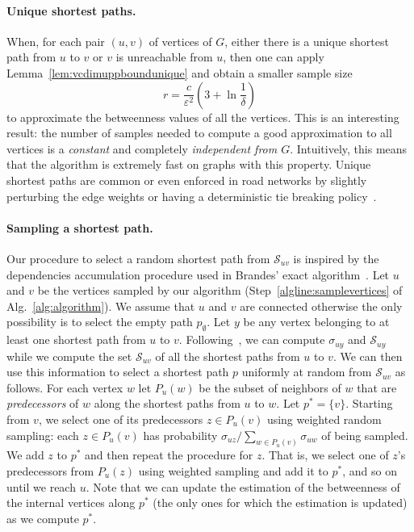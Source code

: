 \paragraph{Unique shortest paths.} 
When, for each pair $(u,v)$ of vertices of $G$, either there is a unique
shortest path from $u$ to $v$ or $v$ is unreachable from $u$, 
 then one can apply Lemma~\ref{lem:vcdimuppboundunique} and obtain a smaller
sample size
\[
  r= \frac{c}{\varepsilon^2}\left(3+\ln\frac{1}{\delta}\right)
\]
to approximate the betweenness values of all the vertices. 
This is an interesting result: the number of samples needed to compute a good
approximation to all vertices is a \emph{constant} and completely
\emph{independent from $G$}. Intuitively, this means that the algorithm is
extremely fast on graphs with this property. Unique shortest paths are common or
even enforced in road networks by slightly perturbing the edge weights or having
a deterministic tie breaking policy~\citep{GeisbergerSS08}.

\paragraph{Sampling a shortest path.}
Our procedure to select a random shortest path from $\mathcal{S}_{uv}$ is
inspired by the dependencies accumulation procedure used in Brandes' exact
algorithm~\citep{Brandes01}. Let $u$ and $v$ be the vertices sampled by our algorithm
(Step~\ref{algline:samplevertices} of Alg.~\ref{alg:algorithm}). We assume that $u$ and
$v$ are connected otherwise the only possibility is to select the empty path
$p_\emptyset$. Let $y$ be any vertex belonging to at least one shortest path
from $u$ to $v$. Following~\citet{Brandes01}, we can compute $\sigma_{uy}$ and
$\mathcal{S}_{uy}$ while we compute the set $\mathcal{S}_{uv}$ of all the
shortest paths from $u$ to $v$. We can then use this information to select a
shortest path $p$ uniformly at random from $\mathcal{S}_{uv}$ as follows. For each vertex
$w$ let $P_u(w)$ be the subset of neighbors of $w$ that are \emph{predecessors}
of $w$ along the shortest paths from $u$ to $w$. Let $p^*=\{v\}$. Starting from
$v$, we select one of its predecessors $z\in P_u(v)$ using weighted random
sampling: each $z\in P_u(v)$ has probability $\sigma_{uz}/\sum_{w\in
P_u(v)}\sigma_{uw}$ of being sampled. We add $z$ to $p^*$ and then repeat the
procedure for $z$. That is, we select one of $z$'s predecessors from $P_u(z)$
using weighted sampling and add it to $p^*$, and so on until we reach $u$. Note
that we can update the estimation of the betweenness of the internal vertices
along $p^*$ (the only ones for which the estimation is updated) as we compute
$p^*$.

